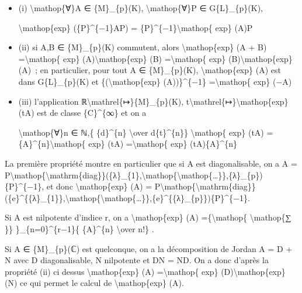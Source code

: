 \documentclass[]{article}
\begin{document}
\begin{itemize}
\item
  (i) \textbackslash{}mathop\{∀\}A ∈ \{M\}\_\{p\}(K),
  \textbackslash{}mathop\{∀\}P ∈ G\{L\}\_\{p\}(K),

  \textbackslash{}mathop\{exp\} (\{P\}\^{}\{−1\}AP) =
  \{P\}\^{}\{−1\}\textbackslash{}mathop\{ exp\} (A)P
\item
  (ii) si A,B ∈ \{M\}\_\{p\}(K) commutent, alors
  \textbackslash{}mathop\{exp\} (A + B) =\textbackslash{}mathop\{ exp\}
  (A)\textbackslash{}mathop\{exp\} (B) =\textbackslash{}mathop\{ exp\}
  (B)\textbackslash{}mathop\{exp\} (A)~; en particulier, pour tout A ∈
  \{M\}\_\{p\}(K), \textbackslash{}mathop\{exp\} (A) est dans
  G\{L\}\_\{p\}(K) et \{(\textbackslash{}mathop\{exp\} (A))\}\^{}\{−1\}
  =\textbackslash{}mathop\{ exp\} (−A)
\item
  (iii) l'application ℝ\textbackslash{}mathrel\{↦\}\{M\}\_\{p\}(K),
  t\textbackslash{}mathrel\{↦\}\textbackslash{}mathop\{exp\} (tA) est de
  classe \{C\}\^{}\{∞\} et on a

  \textbackslash{}mathop\{∀\}n ∈ ℕ,\{ \{d\}\^{}\{n\}
  \textbackslash{}over d\{t\}\^{}\{n\}\} \textbackslash{}mathop\{ exp\}
  (tA) = \{A\}\^{}\{n\}\textbackslash{}mathop\{ exp\} (tA)
  =\textbackslash{}mathop\{ exp\} (tA)\{A\}\^{}\{n\}
\end{itemize}

La première propriété montre en particulier que si A est diagonalisable,
on a A =
P\textbackslash{}mathop\{\textbackslash{}mathrm\{diag\}\}(\{λ\}\_\{1\},\textbackslash{}mathop\{\textbackslash{}mathop\{\ldots{}\}\},\{λ\}\_\{p\})\{P\}\^{}\{−1\},
et donc \textbackslash{}mathop\{exp\} (A) =
P\textbackslash{}mathop\{\textbackslash{}mathrm\{diag\}\}(\{e\}\^{}\{\{λ\}\_\{1\}\},\textbackslash{}mathop\{\textbackslash{}mathop\{\ldots{}\}\},\{e\}\^{}\{\{λ\}\_\{p\}\})\{P\}\^{}\{−1\}.

Si A est nilpotente d'indice r, on a \textbackslash{}mathop\{exp\} (A)
=\{\textbackslash{}mathop\{ \textbackslash{}mathop\{∑ \}\}
\}\_\{n=0\}\^{}\{r−1\}\{ \{A\}\^{}\{n\} \textbackslash{}over n!\} .

Si A ∈ \{M\}\_\{p\}(ℂ) est quelconque, on a la décomposition de Jordan A
= D + N avec D diagonalisable, N nilpotente et DN = ND. On a donc
d'après la propriété (ii) ci dessus \textbackslash{}mathop\{exp\} (A)
=\textbackslash{}mathop\{ exp\} (D)\textbackslash{}mathop\{exp\} (N) ce
qui permet le calcul de \textbackslash{}mathop\{exp\} (A).
\end{document}
